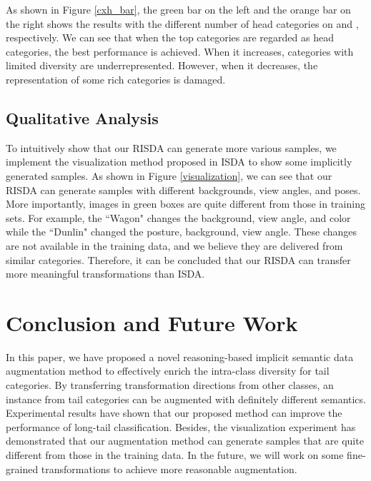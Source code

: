\documentclass[letterpaper]{article} \usepackage{aaai22}  \usepackage{times}  \usepackage{helvet}  \usepackage{courier}  \usepackage[hyphens]{url}  \usepackage{graphicx} \usepackage{bm}
\begin{document}
	As shown in Figure \ref{cxh_bar}, the green bar on the left and the orange bar on the right shows the results with the different number of head categories on  and , respectively. We can see that when the top  categories are regarded as head categories, the best performance is achieved. When it increases,  categories with limited diversity are underrepresented. However, when it decreases, the representation of some rich categories is damaged.
	


	
	
\subsection{Qualitative Analysis}
	

	
	To intuitively show that our RISDA can generate more various samples, we implement the visualization method proposed in ISDA to show some implicitly generated samples. As shown in Figure \ref{visualization}, we can see that our RISDA can generate samples with different backgrounds, view angles, and poses. More importantly, images in green boxes are quite different from those in training sets. For example, the ``Wagon" changes the background, view angle, and color while the ``Dunlin" changed the posture, background, view angle.
	These changes are not available in the training data, and we believe they are delivered from similar categories. Therefore, it can be concluded that our RISDA can transfer more meaningful transformations than ISDA.


	\section{Conclusion and Future Work}
	In this paper, we have proposed a novel reasoning-based implicit semantic data augmentation method to effectively enrich the intra-class diversity for tail categories. By transferring transformation directions from other classes, an instance from tail categories can be augmented with definitely different semantics. Experimental results have shown that our proposed method can improve the performance of long-tail classification. Besides, the visualization experiment has demonstrated that our augmentation method can generate samples that are quite different from those in the training data. In the future, we will work on some fine-grained transformations to achieve more reasonable augmentation.
	
\end{document}
